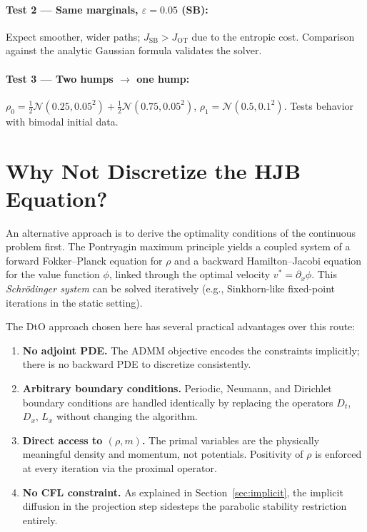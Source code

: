 \documentclass[11pt]{article}
\begin{document}
\paragraph{Test 2 --- Same marginals, $\varepsilon = 0.05$ (SB):}
Expect smoother, wider paths; $J_{\mathrm{SB}} > J_{\mathrm{OT}}$ due to
the entropic cost.  Comparison against the analytic Gaussian formula
validates the solver.

\paragraph{Test 3 --- Two humps $\to$ one hump:}
$\rho_0 = \frac{1}{2}\mathcal{N}(0.25,0.05^2) + \frac{1}{2}\mathcal{N}(0.75,0.05^2)$,
$\rho_1 = \mathcal{N}(0.5, 0.1^2)$.
Tests behavior with bimodal initial data.

\appendix
\section{Why Not Discretize the HJB Equation?}

An alternative approach is to derive the optimality conditions of the
continuous problem first.  The Pontryagin maximum principle yields a coupled
system of a forward Fokker--Planck equation for $\rho$ and a backward
Hamilton--Jacobi equation for the value function $\phi$, linked through the
optimal velocity $v^* = \partial_x \phi$.  This \emph{Schr\"{o}dinger system}
can be solved iteratively (e.g., Sinkhorn-like fixed-point iterations in the
static setting).

The DtO approach chosen here has several practical advantages over this route:
\begin{enumerate}
  \item \textbf{No adjoint PDE.}  The ADMM objective encodes the constraints
        implicitly; there is no backward PDE to discretize consistently.
  \item \textbf{Arbitrary boundary conditions.}  Periodic, Neumann, and
        Dirichlet boundary conditions are handled identically by replacing
        the operators $D_t$, $D_x$, $L_x$ without changing the algorithm.
  \item \textbf{Direct access to $(\rho, m)$.}  The primal variables are
        the physically meaningful density and momentum, not potentials.
        Positivity of $\rho$ is enforced at every iteration via the proximal
        operator.
  \item \textbf{No CFL constraint.}  As explained in Section~\ref{sec:implicit},
        the implicit diffusion in the projection step sidesteps the parabolic
        stability restriction entirely.
\end{enumerate}
\end{document}
